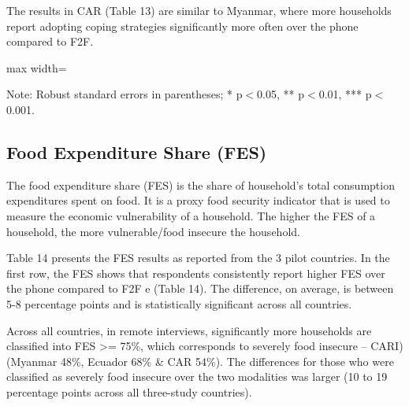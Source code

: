 \documentclass[11pt,harvard]{article}
\begin{document}
The results in CAR (Table 13) are similar to Myanmar, where more households report adopting coping strategies significantly more often over the phone compared to F2F. 
	
	\begin{table}[htbp]
		\centering
		\begin{adjustbox}{max width=\textwidth}
			\begin{threeparttable}
				\caption{CAR: Each Coping Strategy Used}
				\scriptsize
				 
				\label{tab:LCS_Ind_Modality_CAR}
				\begin{tablenotes}
					\item Note: Robust standard errors in parentheses; * p$<$0.05, ** p$<$0.01, *** p$<$0.001. 
				\end{tablenotes}
			\end{threeparttable}
		\end{adjustbox}
	\end{table}
	
	\pagebreak
	
\subsection{Food Expenditure Share (FES)}

The food expenditure share (FES) is the share of household’s total consumption expenditures spent on food. It is a proxy food security indicator that is used to measure the economic vulnerability of a household. The higher the FES of a household, the more vulnerable/food insecure the household.

Table 14 presents the FES results as reported from the 3 pilot countries. In the first row, the FES  shows that respondents consistently report higher FES over the phone compared to F2F e  (Table 14). The difference, on average, is between 5-8 percentage points and is statistically significant across all countries.

Across all countries, in remote interviews, significantly more households are classified  into FES >= 75\%, which corresponds to severely food insecure – CARI) (Myanmar 48\%, Ecuador 68\% \& CAR 54\%). The differences for those who were classified as severely food insecure over the two modalities was larger (10 to 19 percentage points across all three-study countries).
	
\end{document}
